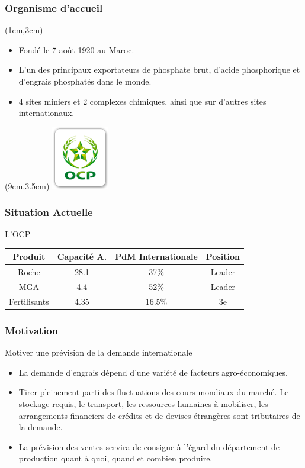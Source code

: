 \documentclass{beamer}
\begin{document}
\begin{frame}
	\frametitle{Organisme d’accueil}
	\begin{textblock*}{7cm}(1cm,3cm)
		\begin{itemize}
			\item Fondé le 7 août 1920 au Maroc.
			\item L'un des principaux exportateurs de phosphate brut, d’acide phosphorique et d’engrais phosphatés dans le monde.
			\item 4 sites miniers et 2 complexes chimiques, ainsi que sur d'autres sites internationaux.
		\end{itemize}
	\end{textblock*}
	
	\begin{textblock*}{5cm}(9cm,3.5cm) %
		\includegraphics[width=2.5cm]{logo-ocp}
	\end{textblock*}
\end{frame}

\begin{frame}
\frametitle{Situation Actuelle}
\begin{block}{L'OCP}
\begin{table}
\centering 
  \begin{tabular}{|c|c|c|c|}
  \hline
  \small{Produit} & \small{Capacité A.} & \small{PdM Internationale} & \small{Position} \\
  \hline
  Roche & 28.1 & 37\% & Leader\\
  MGA & 4.4 & 52\% & Leader\\
  Fertilisants & 4.35 & 16.5\% & 3e\\
  \hline
  \end{tabular}
  \end{table}
  \end{block} 
\end{frame}

\begin{frame}
  \frametitle{Motivation}
  \begin{block}{Motiver une prévision de la demande internationale}
    \begin{itemize}
    \item La demande d'engrais dépend d'une variété de facteurs agro-économiques.
    \item Tirer pleinement parti des fluctuations des cours mondiaux du marché. Le stockage requis, le transport, les ressources humaines à mobiliser, les arrangements financiers de crédits et de devises étrangères sont tributaires de la demande.
    \item  La prévision des ventes servira de consigne à l’égard du département de production quant à quoi, quand et combien produire.
    \end{itemize}
    \end{block}
\end{frame}
\end{document}
